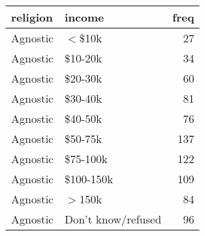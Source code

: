 \begin{tabular}{llr}
  \toprule
 religion & income & freq \\ 
  \midrule
  Agnostic & $<$\$10k &  27 \\ 
  Agnostic & \$10-20k &  34 \\ 
  Agnostic & \$20-30k &  60 \\ 
  Agnostic & \$30-40k &  81 \\ 
  Agnostic & \$40-50k &  76 \\ 
  Agnostic & \$50-75k & 137 \\ 
  Agnostic & \$75-100k & 122 \\ 
  Agnostic & \$100-150k & 109 \\ 
  Agnostic & $>$150k &  84 \\ 
  Agnostic & Don't know/refused &  96 \\ 
   \bottomrule
\end{tabular}
